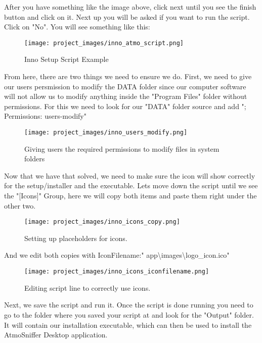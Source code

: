 	After you have something like the image above, click next until you see the finish button and click on it. Next up you will be asked if you want to run the script. Click on "No".
	You will see something like this:

\begin{figure}[H]
\centering
\texttt{[image: project\_images/inno\_atmo\_script.png]}
 \caption{Inno Setup Script Example}
 \label{fig:inno atmo script}
\end{figure}

	From here, there are two things we need to ensure we do. First, we need to give our users persmission to modify the DATA folder since our computer software will not allow us to modify anything inside the "Program Files" folder without permissions. For this we need to look for our "DATA" folder source and add "; Permissions: users-modify"

\begin{figure}[H]
\centering
\texttt{[image: project\_images/inno\_users\_modify.png]}
 \caption{Giving users the required permissions to modify files in system folders}
 \label{fig:inno users modify}
\end{figure}

	Now that we have that solved, we need to make sure the icon will show correctly for the setup/installer and the executable. Lets move down the script until we see the "[Icons]" Group, here we will copy both items and paste them right under the other two.

\begin{figure}[H]
\centering
\texttt{[image: project\_images/inno\_icons\_copy.png]}
 \caption{Setting up placeholders for icons.}
 \label{fig:inno icons copy}
\end{figure}

	And we edit both copies with IconFilename:" \textbraceleft app\textbraceright 	\textbackslash images\textbackslash logo\_icon.ico" 

\begin{figure}[H]
\centering
\texttt{[image: project\_images/inno\_icons\_iconfilename.png]}
 \caption{Editing script line to correctly use icons.}
 \label{fig:inno icons iconfilename}
\end{figure}

	Next, we save the script and run it. Once the script is done running you need to go to the folder where you saved your script at and look for the "Output" folder. It will contain our installation executable, which can then be used to install the AtmoSniffer Desktop application.

